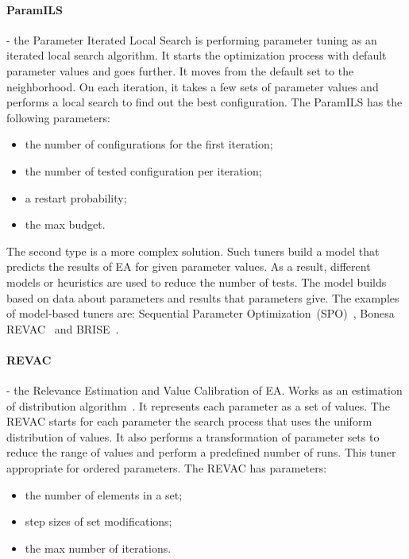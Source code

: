 \paragraph{ParamILS} - the Parameter Iterated Local Search is performing parameter tuning as an iterated local search algorithm. It starts the optimization process with default parameter values and goes further. It moves from the default set to the neighborhood. On each iteration, it takes a few sets of parameter values and performs a local search to find out the best configuration. The ParamILS has the following parameters:
\begin{itemize}
	\item the number of configurations for the first iteration;
	\item the number of tested configuration per iteration;
	\item a restart probability;
	\item the max budget.
\end{itemize}


The second type is a more complex solution. Such tuners build a model that predicts the results of EA for given parameter values. As a result, different models or heuristics are used to reduce the number of tests. The model builds based on data about parameters and results that parameters give. The examples of model-based tuners are: Sequential Parameter Optimization~(SPO)~\cite{bartz2004analysis}, Bonesa~\cite{smit2012parameter, bartz2005sequential} REVAC~\cite{nannen2007efficient} and BRISE~\cite{pukhkaiev2016, pukhkaiev19}.

\paragraph{REVAC} - the Relevance Estimation and Value Calibration of EA. Works as an estimation of distribution algorithm~\cite{pelikan2002, montero2012state}. It represents each parameter as a set of values. The REVAC starts for each parameter the search process that uses the uniform distribution of values. It also performs a transformation of parameter sets to reduce the range of values and perform a predefined number of runs. This tuner appropriate for ordered parameters. The REVAC has parameters:
\begin{itemize}
	\item the number of elements in a set;
	\item step sizes of set modifications;
	\item the max number of iterations.
\end{itemize} 

